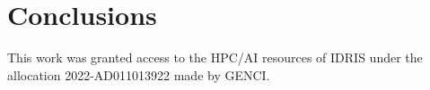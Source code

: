 \documentclass{aa}
\begin{document}
\section{Conclusions}\label{Sec:conclusion}
\begin{acknowledgements}
This work was granted access to the HPC/AI resources of IDRIS under the allocation 2022-AD011013922 made by GENCI.
\end{acknowledgements}
 
\end{document}
